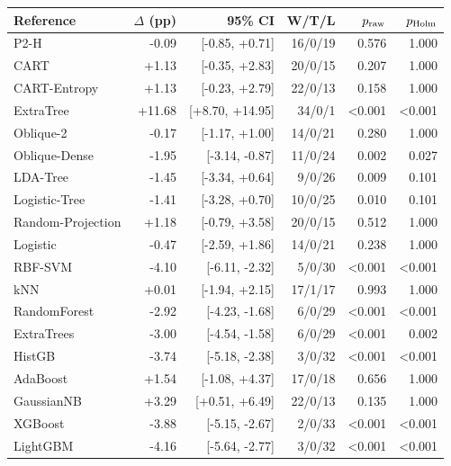 \begin{tabular}{lrrrrr}
\toprule
Reference & $\Delta$ (pp) & 95\% CI & W/T/L & $p_{\rm raw}$ & $p_{\rm Holm}$ \\
\midrule
P2-H & -0.09 & [-0.85, +0.71] & 16/0/19 & 0.576 & 1.000 \\
CART & +1.13 & [-0.35, +2.83] & 20/0/15 & 0.207 & 1.000 \\
CART-Entropy & +1.13 & [-0.23, +2.79] & 22/0/13 & 0.158 & 1.000 \\
ExtraTree & +11.68 & [+8.70, +14.95] & 34/0/1 & <0.001 & <0.001 \\
Oblique-2 & -0.17 & [-1.17, +1.00] & 14/0/21 & 0.280 & 1.000 \\
Oblique-Dense & -1.95 & [-3.14, -0.87] & 11/0/24 & 0.002 & 0.027 \\
LDA-Tree & -1.45 & [-3.34, +0.64] & 9/0/26 & 0.009 & 0.101 \\
Logistic-Tree & -1.41 & [-3.28, +0.70] & 10/0/25 & 0.010 & 0.101 \\
Random-Projection & +1.18 & [-0.79, +3.58] & 20/0/15 & 0.512 & 1.000 \\
Logistic & -0.47 & [-2.59, +1.86] & 14/0/21 & 0.238 & 1.000 \\
RBF-SVM & -4.10 & [-6.11, -2.32] & 5/0/30 & <0.001 & <0.001 \\
kNN & +0.01 & [-1.94, +2.15] & 17/1/17 & 0.993 & 1.000 \\
RandomForest & -2.92 & [-4.23, -1.68] & 6/0/29 & <0.001 & <0.001 \\
ExtraTrees & -3.00 & [-4.54, -1.58] & 6/0/29 & <0.001 & 0.002 \\
HistGB & -3.74 & [-5.18, -2.38] & 3/0/32 & <0.001 & <0.001 \\
AdaBoost & +1.54 & [-1.08, +4.37] & 17/0/18 & 0.656 & 1.000 \\
GaussianNB & +3.29 & [+0.51, +6.49] & 22/0/13 & 0.135 & 1.000 \\
XGBoost & -3.88 & [-5.15, -2.67] & 2/0/33 & <0.001 & <0.001 \\
LightGBM & -4.16 & [-5.64, -2.77] & 3/0/32 & <0.001 & <0.001 \\
\bottomrule
\end{tabular}
